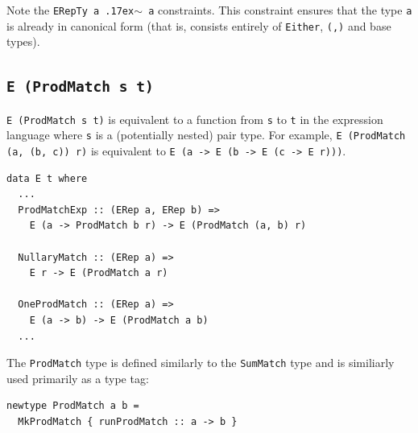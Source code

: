 \documentclass[runningheads, a4paper]{llncs}
\newcommand{\typeeq}{\raise.17ex\hbox{$\scriptstyle\mathtt{\sim}$}\,\;}
\newcommand{\ttt}{\texttt}
\newenvironment{todo}
  {\ifthenelse{\isundefined{\showtodos}}{\comment}{\begin{tcolorbox}
    \textbf{TODO}:}}
  {\ifthenelse{\isundefined{\showtodos}}{\endcomment}{\end{tcolorbox}}
  }
\begin{document}
Note the \ttt{ERepTy a \typeeq a} constraints. This constraint ensures that the type
\ttt{a} is already in canonical form (that is, consists entirely of
\ttt{Either}, \ttt{(,)} and base types).

\subsection{\ttt{E (ProdMatch s t)}}

\ttt{E (ProdMatch s t)} is equivalent to a function from \ttt{s} to
\ttt{t} in the expression language where \ttt{s} is a (potentially
nested) pair type. For example, \ttt{E (ProdMatch (a, (b, c)) r)} is
equivalent to \ttt{E (a -> E (b -> E (c -> E r)))}.

\begin{lstlisting}
data E t where
  ...
  ProdMatchExp :: (ERep a, ERep b) =>
    E (a -> ProdMatch b r) -> E (ProdMatch (a, b) r)

  NullaryMatch :: (ERep a) =>
    E r -> E (ProdMatch a r)

  OneProdMatch :: (ERep a) =>
    E (a -> b) -> E (ProdMatch a b)
  ...
\end{lstlisting}

The \ttt{ProdMatch} type is defined similarly to the \ttt{SumMatch} type and is
similiarly used primarily as a type tag:

\begin{lstlisting}
newtype ProdMatch a b =
  MkProdMatch { runProdMatch :: a -> b }
\end{lstlisting}



\end{document}
